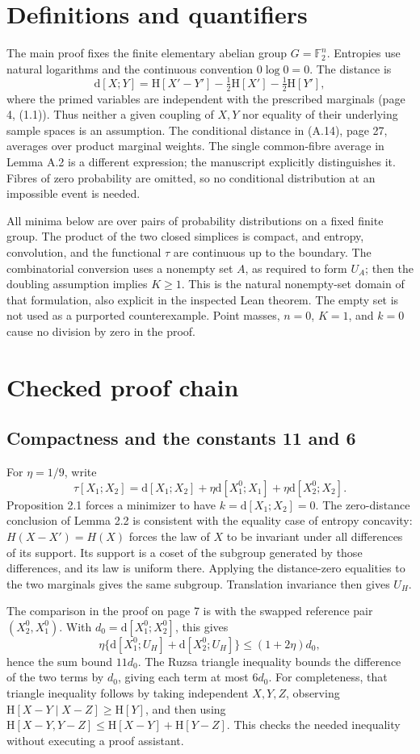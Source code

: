 \documentclass[10pt]{article}
\begin{document}
\section*{Definitions and quantifiers}
The main proof fixes the finite elementary abelian group \(G=\mathbb F_2^n\). Entropies use natural logarithms and the continuous convention \(0\log 0=0\). The distance is \[\mathrm d[X;Y]=\mathrm H[X'-Y']-\tfrac12\mathrm H[X']-\tfrac12\mathrm H[Y'],\] where the primed variables are independent with the prescribed marginals (page 4, (1.1)). Thus neither a given coupling of \(X,Y\) nor equality of their underlying sample spaces is an assumption. The conditional distance in (A.14), page 27, averages over product marginal weights. The single common-fibre average in Lemma A.2 is a different expression; the manuscript explicitly distinguishes it. Fibres of zero probability are omitted, so no conditional distribution at an impossible event is needed.\par
All minima below are over pairs of probability distributions on a fixed finite group. The product of the two closed simplices is compact, and entropy, convolution, and the functional \(\tau\) are continuous up to the boundary. The combinatorial conversion uses a nonempty set \(A\), as required to form \(U_A\); then the doubling assumption implies \(K\ge1\). This is the natural nonempty-set domain of that formulation, also explicit in the inspected Lean theorem. The empty set is not used as a purported counterexample. Point masses, \(n=0\), \(K=1\), and \(k=0\) cause no division by zero in the proof.\par
\section*{Checked proof chain}
\subsection*{Compactness and the constants 11 and 6}
For \(\eta=1/9\), write \[\tau[X_1;X_2]=\mathrm d[X_1;X_2]
       +\eta\mathrm d[X_1^0;X_1]+\eta\mathrm d[X_2^0;X_2].\] Proposition 2.1 forces a minimizer to have \(k=\mathrm d[X_1;X_2]=0\). The zero-distance conclusion of Lemma 2.2 is consistent with the equality case of entropy concavity: \(H(X-X')=H(X)\) forces the law of \(X\) to be invariant under all differences of its support. Its support is a coset of the subgroup generated by those differences, and its law is uniform there. Applying the distance-zero equalities to the two marginals gives the same subgroup. Translation invariance then gives \(U_H\).\par
The comparison in the proof on page 7 is with the swapped reference pair \((X_2^0,X_1^0)\). With \(d_0=\mathrm d[X_1^0;X_2^0]\), this gives \[\eta\{\mathrm d[X_1^0;U_H]+\mathrm d[X_2^0;U_H]\}
 \le(1+2\eta)d_0,\] hence the sum bound \(11d_0\). The Ruzsa triangle inequality bounds the difference of the two terms by \(d_0\), giving each term at most \(6d_0\). For completeness, that triangle inequality follows by taking independent \(X,Y,Z\), observing \(\mathrm H[X-Y\mid X-Z]\ge\mathrm H[Y]\), and then using \(\mathrm H[X-Y,Y-Z]\le\mathrm H[X-Y]+\mathrm H[Y-Z]\). This checks the needed inequality without executing a proof assistant.\par
\end{document}
